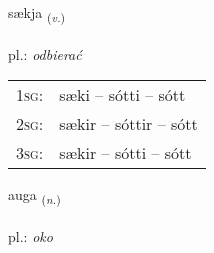 \documentclass[frontgrid, backgrid]{flacards}\usepackage[]{graphicx}\usepackage[]{xcolor}
\begin{document}
\renewcommand{\flhead}{\vskip5pt \fboxsep=0pt {\small\bfseries\footnotesize Sagnorð | czasownik}}
\renewcommand{\fcfoot}{\vskip5pt \fboxsep=0pt \hspace{2pt}{\small\bfseries\footnotesize 1K}}

\renewcommand{\blhead}{\vskip5pt {\small\bfseries\footnotesize Sagnorð | czasownik }}
\renewcommand{\bcfoot}{\vskip5pt \hspace{2pt}{\small\bfseries\footnotesize 1K}}


{sækja \small{\textsubscript{(\textit{v.})}} \\[1ex] %
\textphonetic{[saiːca]} \\
pl.: \emph{odbierać} \\  [2ex]
\renewcommand*{\arraystretch}{0.8}
\begin{tabular}{p{1cm}l}
\textsc{1sg}: & sæki -- sótti -- sótt \\ 
\textsc{2sg}: & sækir -- sóttir -- sótt \\ 
\textsc{3sg}: & sækir -- sótti -- sótt \\ 
\end{tabular}
}

\renewcommand{\flhead}{\vskip5pt \fboxsep=0pt {\small\bfseries\footnotesize Nafnorð | rzeczownik}}
\renewcommand{\fcfoot}{\vskip5pt \fboxsep=0pt \hspace{2pt}{\small\bfseries\footnotesize 1K}}

\renewcommand{\blhead}{\vskip5pt {\small\bfseries\footnotesize Nafnorð | rzeczownik }}
\renewcommand{\bcfoot}{\vskip5pt \hspace{2pt}{\small\bfseries\footnotesize 1K}}


{auga \small{\textsubscript{(\textit{n.})}} \\[1ex] %
\textphonetic{[œiːɣa]} \\
pl.: \emph{oko} \\  [2ex]
\renewcommand*{\arraystretch}{0.8}
}
\end{document}
